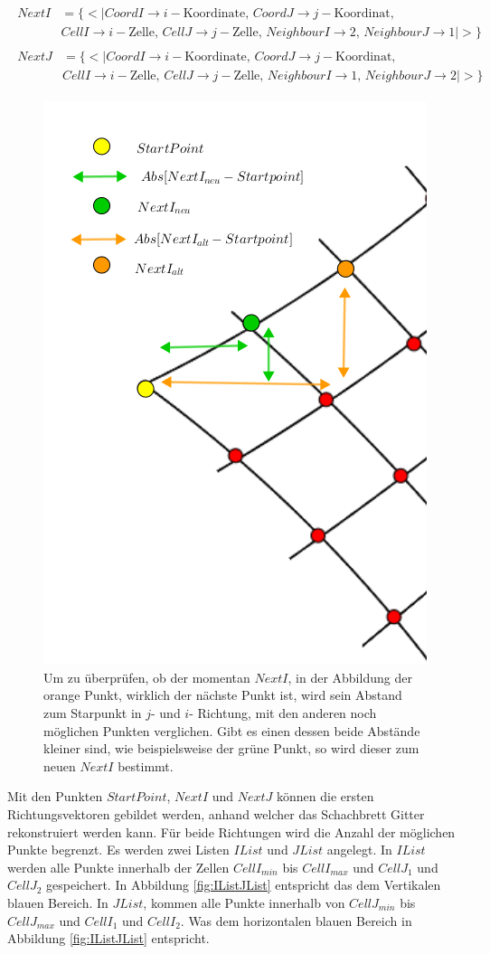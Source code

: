 \begin{gather*}
	\begin{split}
		NextI &= \{ <|CoordI \rightarrow i-\text{Koordinate},\, CoordJ \rightarrow j-\text{Koordinat},\, \\
		&CellI \rightarrow i-\text{Zelle},\, CellJ \rightarrow j-\text{Zelle},\,
		NeighbourI \rightarrow 2, \,NeighbourJ \rightarrow 1  |>\}
	\end{split}\\
	\begin{split}
	NextJ &= \{ <|CoordI \rightarrow i-\text{Koordinate},\, CoordJ \rightarrow j-\text{Koordinat},\, \\
	&CellI \rightarrow i-\text{Zelle},\, CellJ \rightarrow j-\text{Zelle},\,
	NeighbourI \rightarrow 1, \,NeighbourJ \rightarrow 2 |>\}
\end{split}
\end{gather*}




\begin{figure}[!htb]
	\centering
	\includegraphics[width=0.5\linewidth]{images/SearchNextI.png}
	\caption[Überprüfung des gefundenen $NextI$]{Um zu überprüfen, ob der momentan $NextI$, in der Abbildung der orange Punkt, wirklich der nächste Punkt ist, wird sein Abstand zum Starpunkt in $j$- und  $i$- Richtung, mit den anderen noch möglichen Punkten verglichen. Gibt es einen dessen beide Abstände kleiner sind, wie beispielsweise der grüne Punkt, so wird dieser zum neuen $NextI$ bestimmt.}
	\label{fig:FindNextIJ}
\end{figure}


Mit den Punkten $StartPoint$, $NextI$ und $NextJ$ können die ersten Richtungsvektoren gebildet werden, anhand welcher das Schachbrett Gitter rekonstruiert werden kann. Für beide Richtungen wird die Anzahl der möglichen Punkte begrenzt. Es werden zwei Listen $IList$ und $JList$ angelegt. In $IList$ werden alle Punkte innerhalb der Zellen $CellI_{min}$ bis $CellI_{max}$ und $CellJ_1$ und $CellJ_2$ gespeichert. In Abbildung \ref{fig:IListJList} entspricht das dem Vertikalen blauen Bereich. In $JList$, kommen alle Punkte innerhalb von $CellJ_{min}$ bis $CellJ_{max}$ und $CellI_1$ und $CellI_2$. Was dem horizontalen blauen Bereich in Abbildung \ref{fig:IListJList} entspricht. \\

